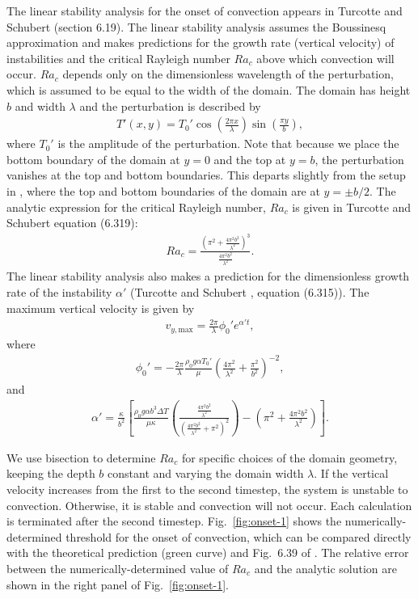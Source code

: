 \documentclass{article}
\begin{document}
The linear stability analysis for the onset of convection appears in Turcotte and Schubert \cite{TS14} (section 6.19). The linear stability analysis assumes the Boussinesq approximation and makes predictions for the growth rate (vertical velocity) of instabilities and the critical Rayleigh number $Ra_c$ above which convection will occur. $Ra_c$ depends only on the dimensionless wavelength of the perturbation, which is assumed to be equal to the width of the domain. The domain has height $b$ and width $\lambda$ and the perturbation is described by
\begin{align*}
T'(x,y) = T_0'\cos\left(\frac{2\pi x}{\lambda}\right)\sin\left(\frac{\pi y}{b} \right),
\end{align*}
where $T_0'$ is the amplitude of the perturbation. Note that because we place the bottom boundary of the domain at $y=0$ and the top at $y=b$, the perturbation vanishes at the top and bottom boundaries. This departs slightly from the setup in \cite{TS14}, where the top and bottom boundaries of the domain are at $y=\pm b/2$. The analytic expression for the critical Rayleigh number, $Ra_c$ is given in Turcotte and Schubert \cite{TS14} equation (6.319):
\begin{align*}
Ra_c=\frac{\left(\pi^2+\frac{4\pi^2 b^2}{\lambda^2}\right)^3}{\frac{4\pi^2 b^2}{\lambda^2}}.
\end{align*}
The linear stability analysis also makes a prediction for the dimensionless growth rate of the instability $\alpha'$ (Turcotte and Schubert \cite{TS14}, equation (6.315)). The maximum vertical velocity is given by
\begin{align*}
v_{y,\text{max}} = \frac{2\pi}{\lambda}\phi_0' e^{\alpha' t},
\end{align*}
where
\begin{align*}
\phi_0' = -\frac{2\pi}{\lambda}\frac{\rho_0 g \alpha T_0'}{\mu}\left(\frac{4\pi^2}{\lambda^2}+\frac{\pi^2}{b^2} \right)^{-2},
\end{align*}
and
\begin{align*}
\alpha'=\frac{\kappa}{b^2}\left[\frac{\rho_0 g \alpha b^3 \Delta T}{\mu \kappa}\left(\frac{\frac{4\pi^2 b^2}{\lambda^2}}{\left(\frac{4\pi^2 b^2}{\lambda^2}+\pi^2\right)^2}\right) -\left(\pi^2+\frac{4\pi^2b^2}{\lambda^2}\right)\right].
\end{align*}

We use bisection to determine $Ra_c$ for specific choices of the domain geometry, keeping the depth $b$ constant and varying the domain width $\lambda$. If the vertical velocity increases from the first to the second timestep, the system is unstable to convection. Otherwise, it is stable and convection will not occur. Each calculation is terminated after the second timestep. Fig.~\ref{fig:onset-1} shows the numerically-determined threshold for the onset of convection, which can be compared directly with the theoretical prediction (green curve) and Fig.~6.39 of \cite{TS14}. The relative error between the numerically-determined value of $Ra_c$ and the analytic solution are shown in the right panel of Fig.~\ref{fig:onset-1}.
\end{document}
